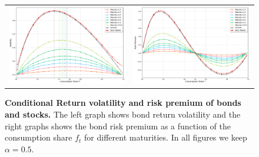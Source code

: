 \begin{figure}[htbp]
\centering
\vspace{0.1in}
\begin{tabular}{cc}
\includegraphics[width=.45\textwidth]{figures/volAPV3ALT.png} &
\includegraphics[width=.45\textwidth]{figures/RPV3ALT.png}
\end{tabular}
\caption{\textbf{Conditional Return volatility and risk premium of bonds and stocks.} \footnotesize{The left graph shows bond return volatility and the right graphs shows the bond risk premium as a function of the consumption share $f_t$ for different maturities. In all figures we keep $\alpha = 0.5$.}} \label{fig:VolaRiskPremium2fALT} 
 \end{figure}

